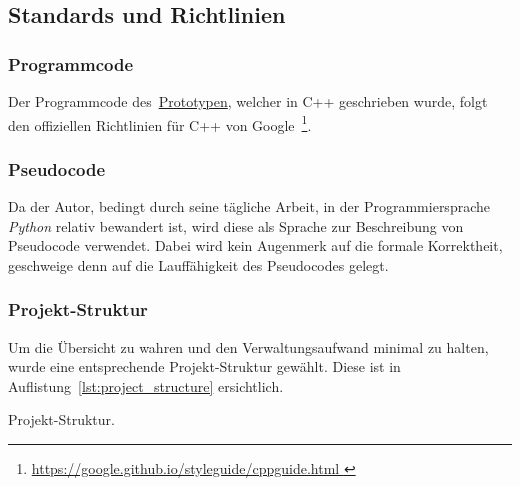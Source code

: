 \subsection{Standards und Richtlinien}
\label{subsec:standards_guidelines}

\subsubsection{Programmcode}
\label{ssubsec:standards_guidelines:code}

Der Programmcode des~\hyperref[chap:prototype]{Prototypen}, welcher in C++ geschrieben wurde, folgt
den offiziellen Richtlinien für C++ von Google~\footnote{
    \href{https://google.github.io/styleguide/cppguide.html}{
        https://google.github.io/styleguide/cppguide.html
    }
}.

\subsubsection{Pseudocode}
\label{ssubsec:standards_guidelines:psuedocode}

Da der Autor, bedingt durch seine tägliche Arbeit, in der
Programmiersprache \textit{Python} relativ bewandert ist, wird diese als
Sprache zur Beschreibung von Pseudocode verwendet.  Dabei wird kein
Augenmerk auf die formale Korrektheit, geschweige denn auf die
Lauffähigkeit des Pseudocodes gelegt.

\subsubsection{Projekt-Struktur}
\label{ssubsec:standards_guidelines:project_structure}

Um die Übersicht zu wahren und den Verwaltungsaufwand minimal zu halten,
wurde eine entsprechende Projekt-Struktur gewählt. Diese ist in
Auflistung~\ref{lst:project_structure} ersichtlich.

\begin{listing}
	\caption{Projekt-Struktur.}\label{lst:project_structure}
\end{listing}
